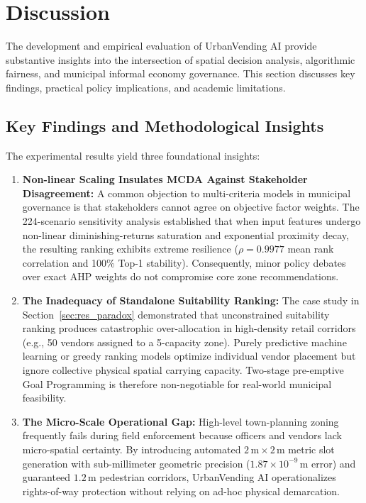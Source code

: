 \section{Discussion}
\label{sec:discussion}

The development and empirical evaluation of UrbanVending AI provide substantive insights into the intersection of spatial decision analysis, algorithmic fairness, and municipal informal economy governance. This section discusses key findings, practical policy implications, and academic limitations.

\subsection{Key Findings and Methodological Insights}
\label{sec:disc_findings}

The experimental results yield three foundational insights:
\begin{enumerate}
    \item \textbf{Non-linear Scaling Insulates MCDA Against Stakeholder Disagreement:} A common objection to multi-criteria models in municipal governance is that stakeholders cannot agree on objective factor weights. The 224-scenario sensitivity analysis established that when input features undergo non-linear diminishing-returns saturation and exponential proximity decay, the resulting ranking exhibits extreme resilience ($\rho = 0.9977$ mean rank correlation and 100\% Top-1 stability). Consequently, minor policy debates over exact AHP weights do not compromise core zone recommendations.
    \item \textbf{The Inadequacy of Standalone Suitability Ranking:} The case study in Section~\ref{sec:res_paradox} demonstrated that unconstrained suitability ranking produces catastrophic over-allocation in high-density retail corridors (e.g., 50 vendors assigned to a 5-capacity zone). Purely predictive machine learning or greedy ranking models optimize individual vendor placement but ignore collective physical spatial carrying capacity. Two-stage pre-emptive Goal Programming is therefore non-negotiable for real-world municipal feasibility.
    \item \textbf{The Micro-Scale Operational Gap:} High-level town-planning zoning frequently fails during field enforcement because officers and vendors lack micro-spatial certainty. By introducing automated $2\,\text{m} \times 2\,\text{m}$ metric slot generation with sub-millimeter geometric precision ($1.87 \times 10^{-9}\,\text{m}$ error) and guaranteed $1.2\,\text{m}$ pedestrian corridors, UrbanVending AI operationalizes rights-of-way protection without relying on ad-hoc physical demarcation.
\end{enumerate}

